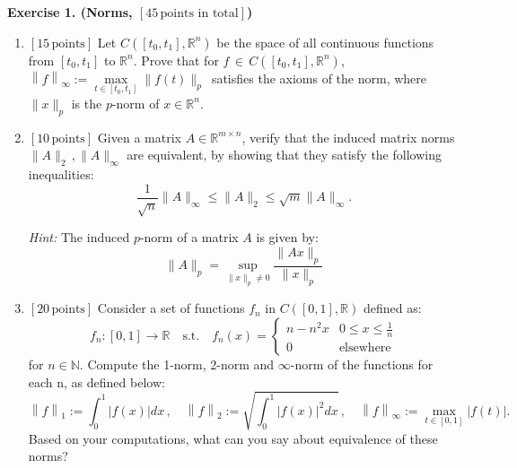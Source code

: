 \documentclass[fleqn,12pt, a4paper]{article}
\def\R{{\mathbb R}}
\def\N{{\mathbb N}}
\theoremstyle{definition}
\numberwithin{equation}{section}
\begin{document}
\noindent
{\bf Exercise 1. (Norms, {\bf$[45\, \text{points in total}]$})}
\noindent
\begin{enumerate}
\item {\bf$[15\, \text{points}]$}
Let $C([t_0, t_1], \R^n)$ be the space of all continuous functions from $[t_0, t_1]$ to $\R^n$. Prove that for $f \, \in \, C([t_0, t_1], \R^n)$,
 $\left\lVert f \right\rVert_\infty := \max\limits_{t \in [t_0, t_1]} \|f(t)\|_p \, $ satisfies the axioms of the norm, where $\|x\|_p$ is the $p$-norm of $x \in \R^n$.

\item {\bf$[10\, \text{points}]$}
Given a matrix $A \in \R^{m \times n}$, verify that the induced matrix norms $\|A\|_2 \, ,\|A\|_\infty$ are equivalent, by showing that they satisfy the following inequalities: 
\begin{displaymath}
\dfrac{1}{\sqrt{n}} \|A\|_\infty \leq \|A\|_2 \leq \sqrt{m} \|A\|_\infty.
\end{displaymath}

{\em Hint:} The induced $p$-norm of a matrix $A$ is given by:
\begin{displaymath}
\|A\|_p=\sup\limits_{\|x\|_p \neq 0} \dfrac{\|Ax\|_p}{\|x\|_p}
\end{displaymath}

\item {\bf$[20\, \text{points}]$}
Consider a set of functions $f_n$ in $C([0,1], \R)$ defined as:
\begin{displaymath}
f_n:[0,1] \rightarrow \R \quad\text{s.t.}\quad
f_n(x) = 
\begin{cases}
n -n^2x & 0\leq x\leq \frac{1}{n}\\
0 & \text{elsewhere}
\end{cases}
\end{displaymath}
for $n\in\N$. Compute the 1-norm, 2-norm and $\infty$-norm of the functions for each n, as defined below:
\begin{displaymath}
\left\lVert f \right\rVert_1 := \int_0^1 \left\lvert f(x) \right\rvert dx\, , \quad
\left\lVert f \right\rVert_2 := \sqrt{\int_0^1 \left\lvert f(x) \right\rvert^2 dx}\, , \quad
\left\lVert f \right\rVert_\infty := \max\limits_{t \in [0, 1]} |f(t)|.
\end{displaymath}
Based on your computations, what can you say about equivalence of these norms?  


\end{enumerate} 
\end{document}

